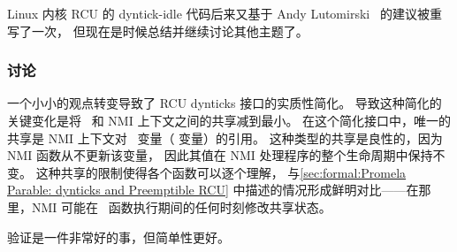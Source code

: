 Linux 内核 RCU 的 dyntick-idle 代码后来又基于
Andy Lutomirski~\cite{PaulMcKenney2015dyntickAndyNMI}
的建议被重写了一次，
但现在是时候总结并继续讨论其他主题了。

\subsubsection{讨论}
\label{sec:formal:Discussion}

一个小小的观点转变导致了 RCU dynticks 接口的实质性简化。
导致这种简化的关键变化是将 \IRQ\ 和 NMI 上下文之间的共享减到最小。
在这个简化接口中，唯一的共享是 NMI 上下文对
\IRQ\ 变量（ 变量）的引用。
这种类型的共享是良性的，因为 NMI 函数从不更新该变量，
因此其值在 NMI 处理程序的整个生命周期中保持不变。
这种共享的限制使得各个函数可以逐个理解，
与\cref{sec:formal:Promela Parable: dynticks and Preemptible RCU}
中描述的情况形成鲜明对比——在那里，NMI 可能在
\IRQ\ 函数执行期间的任何时刻修改共享状态。

验证是一件非常好的事，但简单性更好。

